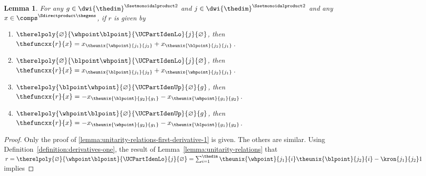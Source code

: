 \documentclass[pdftex]{sigma}
\numberwithin{equation}{section}
\newtheorem{Lemma}[Theorem]{Lemma}
\begin{document}
{
  \newcommand{\infree}{g}
  \newcommand{\infreex}[1]{\infree_{#1}}
  \newcommand{\outbound}{i}
  \newcommand{\outboundx}[1]{\outbound_{#1}}
  \newcommand{\outfree}{j}
  \newcommand{\outfreex}[1]{\outfree_{#1}}
  \newcommand{\therel}{r}
  \newcommand{\thetuple}{x}
  \newcommand{\thetuplex}[1]{\thetuple_{#1}}
  \begin{Lemma}\samepage
    \label{lemma:unitarity-relations-first-derivative}
    For any $\infree\in\dwi{\thedim}^{\Ssetmonoidalproduct 2}$ and $\outfree\in\dwi{\thedim}^{\Ssetmonoidalproduct 2}$ and any $\thetuple\in\comps^{\Sdirectproduct\thegens}$, if $\therel$ is given by
    \begin{enumerate}
    \item\label{lemma:unitarity-relations-first-derivative-1}  $\therelpoly{\varnothing}{\whpoint\blpoint}{\UCPartIdenLo}{\outfree}{\varnothing}$, then $\thefuncxx{\therel}{\thetuple}=\thetuplex{\theunix{\whpoint}{\outfreex{1}}{\outfreex{2}}}+\thetuplex{\theunix{\blpoint}{\outfreex{2}}{\outfreex{1}}}$.
    \item\label{lemma:unitarity-relations-first-derivative-2}  $\therelpoly{\varnothing}{\blpoint\whpoint}{\UCPartIdenLo}{\outfree}{\varnothing}$, then $\thefuncxx{\therel}{\thetuple}=\thetuplex{\theunix{\blpoint}{\outfreex{1}}{\outfreex{2}}}+\thetuplex{\theunix{\whpoint}{\outfreex{2}}{\outfreex{1}}}$.
    \item\label{lemma:unitarity-relations-first-derivative-3} $\therelpoly{\blpoint\whpoint}{\varnothing}{\UCPartIdenUp}{\varnothing}{\infree}$, then $\thefuncxx{\therel}{\thetuple}=-\thetuplex{\theunix{\blpoint}{\infreex{2}}{\infreex{1}}}-\thetuplex{\theunix{\whpoint}{\infreex{1}}{\infreex{2}}}$.
      \item\label{lemma:unitarity-relations-first-derivative-4} $\therelpoly{\whpoint\blpoint}{\varnothing}{\UCPartIdenUp}{\varnothing}{\infree}$, then $\thefuncxx{\therel}{\thetuple}=-\thetuplex{\theunix{\whpoint}{\infreex{2}}{\infreex{1}}}-\thetuplex{\theunix{\blpoint}{\infreex{1}}{\infreex{2}}}$.
    \end{enumerate}
  \end{Lemma}
  \begin{proof}
    Only the proof of \ref{lemma:unitarity-relations-first-derivative-1} is given. The others are similar.
Using  Definition~\ref{definition:derivatives-one},    the result of Lem\-ma~\ref{lemma:unitarity-relations} that $\therel=\therelpoly{\varnothing}{\whpoint\blpoint}{\UCPartIdenLo}{\outfree}{\varnothing}= \sum_{\outbound=1}^\thedim \theunix{\whpoint}{\outfreex{1}}{\outbound}\theunix{\blpoint}{\outfreex{2}}{\outbound}-\kron{\outfreex{1}}{\outfreex{2}}1$ implies

\end{proof}}
\end{document}
